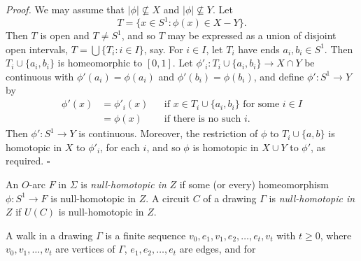 \textit{Proof.} We may assume that $|\phi| \not\subseteq X$ and $|\phi| \not\subseteq Y$. Let
\begin{equation*}
T = \{x \in S^1 : \phi(x) \in X - Y\}.
\end{equation*}
Then $T$ is open and $T \ne S^1$, and so $T$ may be expressed as a union of disjoint open intervals, $T = \bigcup \{T_i : i \in I\}$, say. For $i \in I$, let $T_i$ have ends $a_i, b_i \in S^1$. Then $T_i \cup \{a_i, b_i\}$ is homeomorphic to $[0, 1]$. Let $\phi'_i \colon T_i \cup \{a_i, b_i\} \to X \cap Y$ be continuous with $\phi'(a_i) = \phi(a_i)$ and $\phi'(b_i) = \phi(b_i)$, and define $\phi' \colon S^1 \to Y$ by
\begin{align*}
\phi'(x) &= \phi'_i(x) && \text{if } x \in T_i \cup \{a_i, b_i\} \text{ for some } i \in I \\
&= \phi(x) && \text{if there is no such } i.
\end{align*}
Then $\phi' \colon S^1 \to Y$ is continuous. Moreover, the restriction of $\phi$ to $T_i \cup \{a, b\}$ is homotopic in $X$ to $\phi'_i$, for each $i$, and so $\phi$ is homotopic in $X \cup Y$ to $\phi'$, as required. $\square$

An $O$-arc $F$ in $\Sigma$ is \textit{null-homotopic in} $Z$ if some (or every) homeomorphism $\phi \colon S^1 \to F$ is null-homotopic in $Z$. A circuit $C$ of a drawing $\Gamma$ is \textit{null-homotopic in} $Z$ if $U(C)$ is null-homotopic in $Z$.

A walk in a drawing $\Gamma$ is a finite sequence $v_0, e_1, v_1, e_2, \dots, e_t, v_t$ with $t \ge 0$, where $v_0, v_1, \dots, v_t$ are vertices of $\Gamma$, $e_1, e_2, \dots, e_t$ are edges, and for
